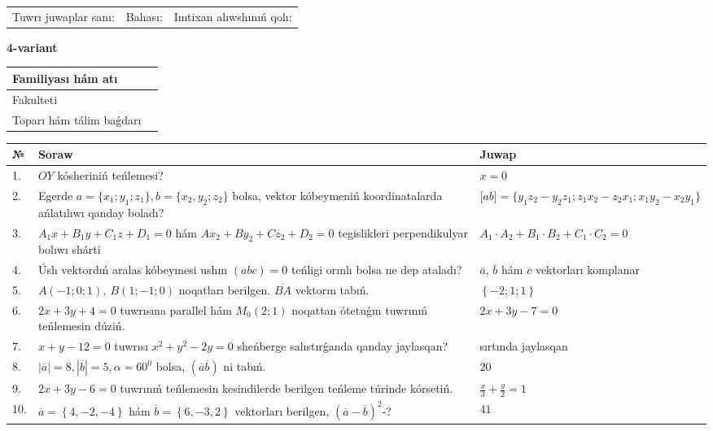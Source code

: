 \documentclass{article}
\begin{document}
\vspace{1cm}

\begin{tabular}{lll}
Tuwrı juwaplar sanı: \underline{\hspace{1.5cm}} & 
Bahası: \underline{\hspace{1.5cm}} & 
Imtixan alıwshınıń qolı: \underline{\hspace{2cm}} \\
\end{tabular}

\egroup

\newpage


\textbf{4-variant}\\

\bgroup
\def\arraystretch{1.6} %

\begin{tabular}{|m{5.7cm}|m{9.5cm}|}
\hline
Familiyası hám atı & \\
\hline
Fakulteti  & \\
\hline
Toparı hám tálim baǵdarı  & \\
\hline
\end{tabular}

\vspace{1cm}

\begin{tabular}{|m{0.7cm}|m{10cm}|m{4cm}|}
\hline
№ & Soraw & Juwap \\
\hline
1. & $OY$ kósheriniń teńlemesi? & $x=0$ \\
\hline
2. & Egerde $a=\{ x_1; y_1; z_1\}, b=\{ x_2, y_2; z_2\}$ bolsa, vektor kóbeymeniń koordinatalarda ańlatılıwı qanday boladı? &  $\lbrack ab\rbrack=\{y_1z_2-y_2z_1; z_1x_2-z_2x_1; x_1y_2-x_2y_1\}$ \\
\hline
3. & $A_1x+B_1y+C_1z+D_1=0$ hám $Ax_2+By_2+Cz_2+D_2=0$ tegislikleri perpendikulyar bolıwı shárti & $A_1\cdot A_2+B_1\cdot B_2+C_1\cdot C_2=0$ \\
\hline
4. & Úsh vektordıń aralas kóbeymesi ushın $(abc)=0$ teńligi orınlı bolsa ne dep ataladı? & $\overline{a}$, $\overline{b}$ hám $\overline{c}$ vektorları komplanar \\
\hline
5. & $A (-1;0;1),\ B (1;-1;0)$ noqatları berilgen. $\overline{BA}$ vektorın tabıń. & $\left\{ - 2;1;1 \right\}$ \\
\hline
6. & $2x+3y+4=0$ tuwrısına parallel hám $M_{0} (2;1)$ noqattan ótetuǵın tuwrınıń teńlemesin dúziń. & $2x+3y-7=0$ \\
\hline
7. & $x+y-12=0$ tuwrısı $x^{2}+y^{2}-2y=0$ sheńberge salıstırǵanda qanday jaylasqan? & sırtında jaylasqan \\
\hline
8. & $\left| \overline{a} \right|=8, \left| \overline{b} \right|=5, \alpha=60^{0}$ bolsa, $( \overline{a}\overline{b} )$ ni tabıń. & $20$ \\
\hline
9. & $2x+3y-6=0$ tuwrınıń teńlemesin kesindilerde berilgen teńleme túrinde kórsetiń. & $\frac{x}{3} + \frac{ y }{ 2 } =  1$ \\
\hline
10. & $\overline{a}=\left\{ 4,-2,-4 \right\}$ hám $\overline{b}=\left\{ 6,-3, 2 \right\}$ vektorları berilgen, $(\overline{a}-\overline{b}) ^{2}$-? & $41$ \\
\hline
\end{tabular}
\end{document}
